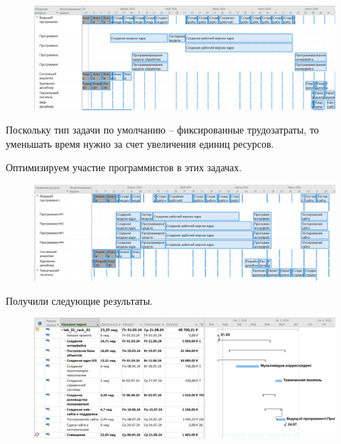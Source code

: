 \begin{figure}[h!]
	\begin{center}
		\includegraphics[scale=0.4]{inc/img/p_15.png}
	\end{center}
	\captionsetup{justification=centering}
	\label{fig:u3}
\end{figure}

Поскольку тип задачи по умолчанию – фиксированные трудозатраты, то
уменьшать время нужно за счет увеличения единиц ресурсов.

Оптимизируем участие программистов в этих задачах.

\begin{figure}[h!]
	\begin{center}
		\includegraphics[scale=0.38]{inc/img/p_16.png}
	\end{center}
	\captionsetup{justification=centering}
	\label{fig:u3}
\end{figure}

\newpage

Получили следующие результаты.

\begin{figure}[h!]
	\begin{center}
		\includegraphics[scale=0.38]{inc/img/p_17.png}
	\end{center}
	\captionsetup{justification=centering}
	\label{fig:u3}
\end{figure}

